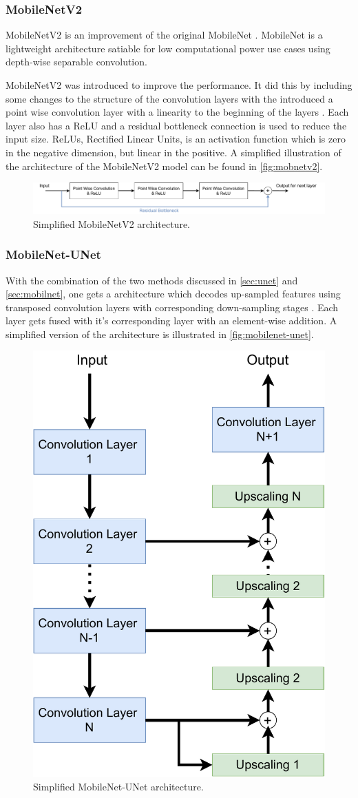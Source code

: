 \subsubsection{MobileNetV2}\label{sec:mobilnet}
MobileNetV2 is an improvement \cite{sandler2019mobilenetv2} of the original MobileNet \cite{howard2017mobilenets}. MobileNet is a lightweight architecture satiable for low computational power use cases using depth-wise separable convolution. 

MobileNetV2 was introduced to improve the performance. It did this by including some changes to the structure of the convolution layers with the introduced a point wise convolution layer with a linearity to the beginning of the layers \cite{vision_based}. Each layer also has a ReLU and a residual bottleneck connection is used to reduce the input size. ReLUs, Rectified Linear Units, is an  activation function which is zero in the negative dimension, but linear in the positive. A simplified illustration of the architecture of the MobileNetV2 model can be found in \autoref{fig:mobnetv2}.

\begin{figure}[H]
  \centering
  \includegraphics[width=1\textwidth]{img/ML/MobileNetV2.pdf}
  \caption{Simplified MobileNetV2 architecture. }
  \label{fig:mobnetv2}
\end{figure}

\subsubsection{MobileNet-UNet}\label{sec:mobilenet-unet}
With the combination of the two methods discussed in \autoref{sec:unet} and \autoref{sec:mobilnet}, one gets a architecture which decodes up-sampled features using transposed convolution layers with corresponding down-sampling stages \cite{8575250}. Each layer gets fused with it's corresponding layer with an element-wise addition. A simplified version of the architecture is illustrated in \autoref{fig:mobilenet-unet}. 

\begin{figure}[H]
  \centering
  \includegraphics[width=.4\textwidth]{img/ML/MobileNet-UNet.pdf}
  \caption{Simplified MobileNet-UNet architecture. }
  \label{fig:mobilenet-unet}
\end{figure}

